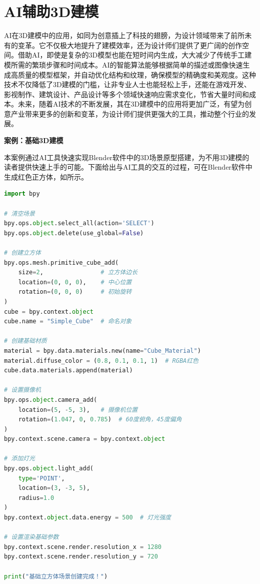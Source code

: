 \section{AI辅助3D建模}


AI在3D建模中的应用，如同为创意插上了科技的翅膀，为设计领域带来了前所未有的变革。它不仅极大地提升了建模效率，还为设计师们提供了更广阔的创作空间。借助AI，即使是复杂的3D模型也能在短时间内生成，大大减少了传统手工建模所需的繁琐步骤和时间成本。AI的智能算法能够根据简单的描述或图像快速生成高质量的模型框架，并自动优化结构和纹理，确保模型的精确度和美观度。这种技术不仅降低了3D建模的门槛，让非专业人士也能轻松上手，还能在游戏开发、影视制作、建筑设计、产品设计等多个领域快速响应需求变化，节省大量时间和成本。未来，随着AI技术的不断发展，其在3D建模中的应用将更加广泛，有望为创意产业带来更多的创新和变革，为设计师们提供更强大的工具，推动整个行业的发展。


\textbf{案例：基础3D建模}

本案例通过AI工具快速实现Blender软件中的3D场景原型搭建，为不用3D建模的读者提供快速上手的可能。下面给出与AI工具的交互的过程，可在Blender软件中生成红色正方体，如所示。



\begin{gptbox} 
\small{ 
\begin{lstlisting}[language=Python] 
import bpy

# 清空场景
bpy.ops.object.select_all(action='SELECT')
bpy.ops.object.delete(use_global=False)

# 创建立方体
bpy.ops.mesh.primitive_cube_add(
    size=2,                # 立方体边长
    location=(0, 0, 0),    # 中心位置
    rotation=(0, 0, 0)     # 初始旋转
)
cube = bpy.context.object
cube.name = "Simple_Cube"  # 命名对象

# 创建基础材质
material = bpy.data.materials.new(name="Cube_Material")
material.diffuse_color = (0.8, 0.1, 0.1, 1)  # RGBA红色
cube.data.materials.append(material)

# 设置摄像机
bpy.ops.object.camera_add(
    location=(5, -5, 3),   # 摄像机位置
    rotation=(1.047, 0, 0.785)  # 60度俯角，45度偏角
)
bpy.context.scene.camera = bpy.context.object

# 添加灯光
bpy.ops.object.light_add(
    type='POINT',
    location=(3, -3, 5),
    radius=1.0
)
bpy.context.object.data.energy = 500  # 灯光强度

# 设置渲染基础参数
bpy.context.scene.render.resolution_x = 1280
bpy.context.scene.render.resolution_y = 720

print("基础立方体场景创建完成！")

\end{lstlisting}
} 
\end{gptbox}

